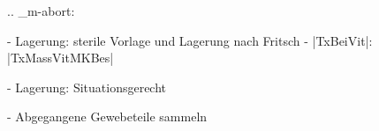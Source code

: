 
.. _m-abort:


\begin{itemize}
  -   Lagerung: sterile Vorlage und Lagerung nach
  Fritsch
  -   |TxBeiVit|: |TxMassVitMKBes|
  \begin{itemize}
    -   Lagerung: Situationsgerecht
  \end{itemize}
  -   Abgegangene Gewebeteile sammeln
\end{itemize}